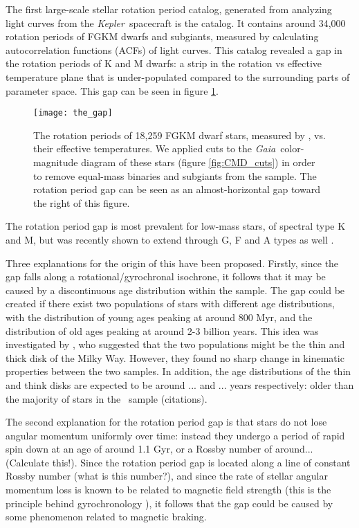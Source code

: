 \documentclass[useAMS, usenatbib, preprint, 12pt]{aastex}
\newcommand{\eg}{{\it e.g.}}
\newcommand{\kepler}{{\it Kepler}}
\newcommand{\gaia}{{\it Gaia}}
\newcommand{\mct}{\citet{mcquillan2014}}
\newcommand{\racomment}[1]{{\color{blue}#1}}
\begin{document}
The first large-scale stellar rotation period catalog, generated from
analyzing light curves from the \kepler\ spacecraft is the
\citet{mcquillan2014} catalog.
It contains around 34,000 rotation periods of FGKM dwarfs and subgiants,
measured by calculating autocorrelation functions (ACFs) of light curves.
This catalog revealed a gap in the rotation periods of K and M dwarfs: a strip
in the rotation vs effective temperature plane that is under-populated
compared to the surrounding parts of parameter space.
This gap can be seen in figure \ref{fig:the_gap}.
\begin{figure}
  \caption{
The rotation periods of 18,259 FGKM dwarf stars, measured by \mct, vs. their
effective temperatures.
We applied cuts to the \gaia\ color-magnitude diagram of these stars (figure
\ref{fig:CMD_cuts}) in order to remove equal-mass binaries and subgiants from
the sample.
The rotation period gap can be seen as an almost-horizontal gap toward the
right of this figure.
}
  \centering
    \texttt{[image: the\_gap]}
\label{fig:the_gap}
\end{figure}
The rotation period gap is most prevalent for low-mass stars, of spectral type
K and M, but was recently shown to extend through G, F and A types as well
\citep{davenport2017}.

Three explanations for the origin of this have been proposed.
Firstly, since the gap falls along a rotational/gyrochronal isochrone, it
follows that it may be caused by a discontinuous age distribution within the
sample.
The gap could be created if there exist two populations of stars with
different age distributions, with the distribution of young ages peaking at
around 800 Myr, and the distribution of old ages peaking at around 2-3 billion
years.
This idea was investigated by \mct, who suggested that the two populations
might be the thin and thick disk of the Milky Way.
However, they found no sharp change in kinematic properties between the two
samples.
In addition, the age distributions of the thin and think disks are expected to
be around ... and ... years respectively: older than the majority of stars in
the \mct\ sample \racomment{(citations)}.

The second explanation for the rotation period gap is that stars do not lose
angular momentum uniformly over time: instead they undergo a period of rapid
spin down at an age of around 1.1 Gyr, or a Rossby number of around...
\racomment{(Calculate this!)}.
Since the rotation period gap is located along a line of constant Rossby
number \racomment{(what is this number?)}, and since the rate of stellar
angular momentum loss is known to be related to magnetic field strength (this
is the principle behind gyrochronology \citep[\eg][]{kawaler1989,
pinsonneault1989, barnes2003, barnes2007, angus2015, vansaders2016,
vansaders2018, angus2019}), it follows that the gap could be caused
by some phenomenon related to magnetic braking.
\end{document}

